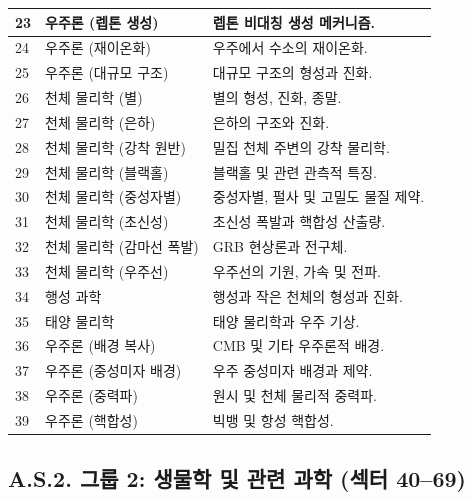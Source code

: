 \documentclass[13pt,a4paper]{article}
\begin{document}
\begin{longtable}{|p{0.9cm}|p{6.0cm}|p{8.6cm}|}
		\hline
		23 & 우주론 (렙톤 생성) & 렙톤 비대칭 생성 메커니즘. \\
		\hline
		24 & 우주론 (재이온화) & 우주에서 수소의 재이온화. \\
		\hline
		25 & 우주론 (대규모 구조) & 대규모 구조의 형성과 진화. \\
		\hline
		26 & 천체 물리학 (별) & 별의 형성, 진화, 종말. \\
		\hline
		27 & 천체 물리학 (은하) & 은하의 구조와 진화. \\
		\hline
		28 & 천체 물리학 (강착 원반) & 밀집 천체 주변의 강착 물리학. \\
		\hline
		29 & 천체 물리학 (블랙홀) & 블랙홀 및 관련 관측적 특징. \\
		\hline
		30 & 천체 물리학 (중성자별) & 중성자별, 펄사 및 고밀도 물질 제약. \\
		\hline
		31 & 천체 물리학 (초신성) & 초신성 폭발과 핵합성 산출량. \\
		\hline
		32 & 천체 물리학 (감마선 폭발) & GRB 현상론과 전구체. \\
		\hline
		33 & 천체 물리학 (우주선) & 우주선의 기원, 가속 및 전파. \\
		\hline
		34 & 행성 과학 & 행성과 작은 천체의 형성과 진화. \\
		\hline
		35 & 태양 물리학 & 태양 물리학과 우주 기상. \\
		\hline
		36 & 우주론 (배경 복사) & CMB 및 기타 우주론적 배경. \\
		\hline
		37 & 우주론 (중성미자 배경) & 우주 중성미자 배경과 제약. \\
		\hline
		38 & 우주론 (중력파) & 원시 및 천체 물리적 중력파. \\
		\hline
		39 & 우주론 (핵합성) & 빅뱅 및 항성 핵합성. \\
		\hline
	\end{longtable}
	
	\subsection*{A.S.2. 그룹 2: 생물학 및 관련 과학 (섹터 40--69)}
	
\end{document}
